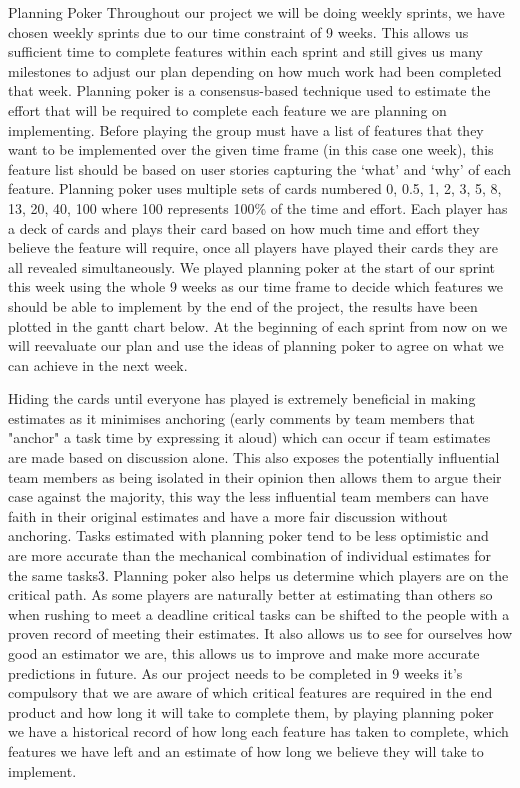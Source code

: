 \documentclass[10pt, a4paper]{article}
\begin{document}
Planning Poker
Throughout our project we will be doing weekly sprints, we have chosen weekly sprints due to our time constraint of 9 weeks. This allows us sufficient time to complete features within each sprint and still gives us many milestones to adjust our plan depending on how much work had been completed that week. Planning poker is a consensus-based technique used to estimate the effort that will be required to complete each feature we are planning on implementing. Before playing the group must have a list of features that they want to be implemented over the given time frame (in this case one week), this feature list should be based on user stories capturing the ‘what’ and ‘why’ of each feature. Planning poker uses multiple sets of cards numbered 0, 0.5, 1, 2, 3, 5, 8, 13, 20, 40, 100 where 100 represents 100\% of the time and effort. Each player has a deck of cards and plays their card based on how much time and effort they believe the feature will require, once all players have played their cards they are all revealed simultaneously. We played planning poker at the start of our sprint this week using the whole 9 weeks as our time frame to decide which features we should be able to implement by the end of the project, the results have been plotted in the gantt chart below. At the beginning of each sprint from now on we will reevaluate our plan and use the ideas of planning poker to agree on what we can achieve in the next week.

Hiding the cards until everyone has played is extremely beneficial in making estimates as it minimises anchoring (early comments by team members that "anchor" a task time by expressing it aloud) which can occur if team estimates are made based on discussion alone. This also exposes the potentially influential team members as being isolated in their opinion then allows them to argue their case against the majority, this way the less influential team members can have faith in their original estimates and have a more fair discussion without anchoring. Tasks estimated with planning poker tend to be less optimistic and are more accurate than the mechanical combination of individual estimates for the same tasks3. Planning poker also helps us determine which players are on the critical path. As some players are naturally better at estimating than others so when rushing to meet a deadline critical tasks can be shifted to the people with a proven record of meeting their estimates. It also allows us to see for ourselves how good an estimator we are, this allows us to improve and make more accurate predictions in future. As our project needs to be completed in 9 weeks it’s compulsory that we are aware of which critical features are required in the end product and how long it will take to complete them, by playing planning poker we have a historical record of how long each feature has taken to complete, which features we have left and an estimate of how long we believe they will take to implement.
\end{document}
